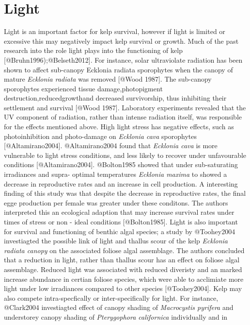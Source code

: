 \documentclass[]{article}
\begin{document}
\section{Light}\label{light}

Light is an important factor for kelp survival, however if light is
limited or excessive this may negatively impact kelp survival or growth.
Much of the past research into the role light plays into the functioning
of kelp {[}@Bruhn1996);@Belseth2012{]}. For instance, solar ultraviolate
radiation has been shown to aﬀect sub-canopy Ecklonia radiata
sporophytes when the canopy of mature \emph{Ecklonia radiata} was
removed {[}@Wood 1987{]}. The sub-canopy sporophytes experienced tissue
damage,photopigment destruction,reducedgrowthand decreased survivorship,
thus inhibiting their settlement and survival {[}@Wood 1987{]}.
Laboratory experiments revealed that the UV component of radiation,
rather than intense radiation itself, was responsible for the eﬀects
mentioned above. High light stress has negative eﬀects, such as
photoinhibition and photo-damage on \emph{Ecklonia cava} sporophytes
{[}@Altamirano2004{]}. @Altamirano2004 found that \emph{Ecklonia cava}
is more vulnerable to light stress conditions, and less likely to
recover under unfavourable conditions {[}@Altamirano2004{]}. @Bolton1985
showed that under sub-saturating irradiances and supra- optimal
temperatures \emph{Ecklonia maxima} to showed a decrease in reproductive
rates and an increase in cell production. A interesting ﬁnding of this
study was that despite the decrease in reproductive rates, the ﬁnal egge
production per female was greater under these conditons. The authors
interpreted this an ecological adaption that may increase survival rates
under times of stress or non - ideal conditions {[}@Bolton1985{]}. Light
is also important for survival and functioning of benthic algal species;
a study by @Toohey2004 investiagted the possible link of light and
thallus scour of the kelp \emph{Ecklonia radiata canopy} on the
associated foliose algal assemblage. The authors concluded that a
reduction in light, rather than thallus scour has an eﬀect on foliose
algal assemblage. Reduced light was associated with reduced diveristy
and an marked increase abundance in certian foliose species, which were
able to acclimiate more light under low irradiances compared to other
species {[}@Toohey2004{]}. Kelp may also compete intra-specﬁcally or
inter-speciﬁcally for light. For instance, @Clark2004 investiagted eﬀect
of canopy shading of \emph{Macrocystis pyrifera} and understorey canopy
shading of \emph{Pterygophora californica} individually and in
\end{document}
